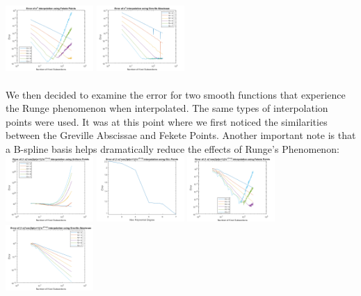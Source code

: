 \documentclass{article}
\begin{document}
\includegraphics[height = 2.5cm]{ExpFekete.png} \includegraphics[height = 2.5cm]{ExpGreville.png}

\paragraph{}
We then decided to examine the error for two smooth functions that experience the Runge phenomenon when interpolated. The same types of interpolation points were used. It was at this point where we first noticed the similarities between the Greville Abscissae and Fekete Points. Another important note is that a B-spline basis helps dramatically reduce the effects of Runge's Phenomenon:
\newline\hspace*{-0.5cm}
\includegraphics[height = 2.5cm]{CosExpUniform.png} \includegraphics[height = 2.5cm]{CosExpGLL.png}
\includegraphics[height = 2.5cm]{CosExpFekete.png} \includegraphics[height = 2.5cm]{CosExpGreville.png}
\end{document}
